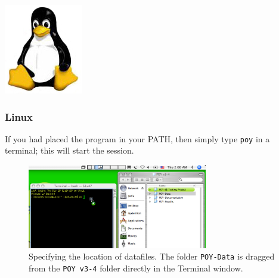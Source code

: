 \begin{flushleft}
	\begin{minipage}[c]{0.075\textwidth}
   		\includegraphics[width=\textwidth]{figures/figLogoLinux.jpg}
	\end{minipage}%
	\quad
	\begin{minipage}[t]{0.89\textwidth}
	   	\subsubsection{Linux}
	\end{minipage}
    If you had placed the program in your PATH, then simply type \texttt{poy}
    in a terminal; this will start the \poy session.
\end{flushleft}


\begin{figure}[htbp]
   \centering
   \includegraphics[width=0.7\textwidth]{figures/figprelim1.jpg}
   \caption{Specifying the location of datafiles. The folder \texttt{POY-Data} is dragged from the \texttt{POY v3-4} folder directly in the Terminal window.}
   \label{fig:figprelim1}
\end{figure}

